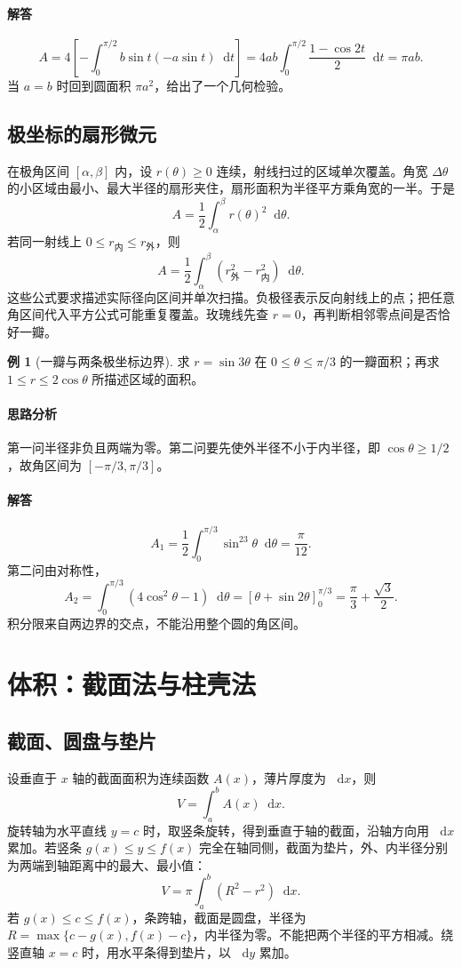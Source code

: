 \documentclass[UTF8,fontset=fandol,12pt,oneside,openany]{ctexrep}
\newcommand{\dd}{\mathop{}\!\mathrm d}
\theoremstyle{definition}
\newtheorem{example}{例}[chapter]
\begin{document}
\paragraph{解答}
\[
 A=4\left[-\int_0^{\pi/2}b\sin t(-a\sin t)\dd t\right]
 =4ab\int_0^{\pi/2}\frac{1-\cos2t}{2}\dd t=\pi ab.
\]
当 $a=b$ 时回到圆面积 $\pi a^2$，给出了一个几何检验。

\subsection{极坐标的扇形微元}
在极角区间 $[\alpha,\beta]$ 内，设 $r(\theta)\ge0$ 连续，射线扫过的区域单次覆盖。角宽 $\Delta\theta$ 的小区域由最小、最大半径的扇形夹住，扇形面积为半径平方乘角宽的一半。于是
\[
 A=\frac12\int_\alpha^\beta r(\theta)^2\dd\theta.
\]
若同一射线上 $0\le r_{\text{内}}\le r_{\text{外}}$，则
\[
 A=\frac12\int_\alpha^\beta(r_{\text{外}}^2-r_{\text{内}}^2)\dd\theta.
\]
这些公式要求描述实际径向区间并单次扫描。负极径表示反向射线上的点；把任意角区间代入平方公式可能重复覆盖。玫瑰线先查 $r=0$，再判断相邻零点间是否恰好一瓣。

\begin{example}[一瓣与两条极坐标边界]
求 $r=\sin3\theta$ 在 $0\le\theta\le\pi/3$ 的一瓣面积；再求 $1\le r\le2\cos\theta$ 所描述区域的面积。
\end{example}
\paragraph{思路分析}第一问半径非负且两端为零。第二问要先使外半径不小于内半径，即 $\cos\theta\ge1/2$，故角区间为 $[-\pi/3,\pi/3]$。
\paragraph{解答}
\[
 A_1=\frac12\int_0^{\pi/3}\sin^23\theta\dd\theta=\frac\pi{12}.
\]
第二问由对称性，
\[
 A_2=\int_0^{\pi/3}(4\cos^2\theta-1)\dd\theta
 =\left[\theta+\sin2\theta\right]_0^{\pi/3}
 =\frac\pi3+\frac{\sqrt3}{2}.
\]
积分限来自两边界的交点，不能沿用整个圆的角区间。

\section{体积：截面法与柱壳法}
\label{lec:12:volume}
\subsection{截面、圆盘与垫片}
设垂直于 $x$ 轴的截面面积为连续函数 $A(x)$，薄片厚度为 $\dd x$，则
\[
 V=\int_a^b A(x)\dd x.
\]
旋转轴为水平直线 $y=c$ 时，取竖条旋转，得到垂直于轴的截面，沿轴方向用 $\dd x$ 累加。若竖条 $g(x)\le y\le f(x)$ 完全在轴同侧，截面为垫片，外、内半径分别为两端到轴距离中的最大、最小值：
\[
 V=\pi\int_a^b(R^2-r^2)\dd x.
\]
若 $g(x)\le c\le f(x)$，条跨轴，截面是圆盘，半径为
$R=\max\{c-g(x),f(x)-c\}$，内半径为零。不能把两个半径的平方相减。绕竖直轴 $x=c$ 时，用水平条得到垫片，以 $\dd y$ 累加。
\end{document}
